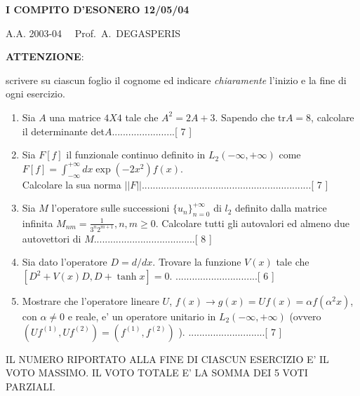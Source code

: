 \documentclass[a4paper,10pt]{article}
\begin{document}
\centerline{\bf I COMPITO D'ESONERO 12/05/04}

\centerline{A.A. 2003-04 \ \ Prof.\ A.\ DEGASPERIS}
\vspace{20pt}
\noindent
{\bf ATTENZIONE}:

\noindent
scrivere su ciascun foglio il cognome ed indicare
\emph{chiaramente} l'inizio e la fine di ogni esercizio.
\vspace{20pt}
\noindent
\begin{enumerate}
\item Sia $A$ una matrice $4X4$ tale che $A^2=2A+3$. Sapendo che 
tr$A=8$, calcolare il determinante det$A$.......................[ 7 ] 
\item Sia $F[f]$ il funzionale continuo definito in
$L_2(-\infty,+\infty)$
come $F[f]=\int_{-\infty}^{+\infty}dx\exp(-2x^2)f(x)$. \\ Calcolare
la sua norma $||F||$..............................................................[ 7 ]
\item Sia $M$ l'operatore sulle successioni $\{u_n\}_{n=0}^{+\infty}$
di $l_2$ definito dalla matrice infinita $M_{n
m}=\frac{1}{3^n2^{m+1}}, n,m\geq0$. Calcolare tutti gli autovalori
ed almeno due autovettori di $M$.....................................[ 8 ]  
\item Sia dato l'operatore $D=d/dx$. Trovare la funzione $V(x)$
tale che $[D^2+V(x)D,D+\tanh x]=0$. ..............................[ 6 ]
\item Mostrare che l'operatore lineare $U$, $f(x)\rightarrow g(x)=
Uf(x)=\alpha f(\alpha^2 x)$, con $\alpha \neq 0$ e reale, e' un operatore
unitario in $L_2(-\infty,+\infty)$ (ovvero
$(Uf^{(1)},Uf^{(2)})=(f^{(1)},f^{(2)})$ ). ............................[ 7 ]

\end{enumerate}

\noindent IL NUMERO RIPORTATO ALLA FINE DI CIASCUN ESERCIZIO
E' IL VOTO MASSIMO. IL VOTO TOTALE E' LA SOMMA DEI 5 VOTI
PARZIALI.



\newpage
\end{document}
